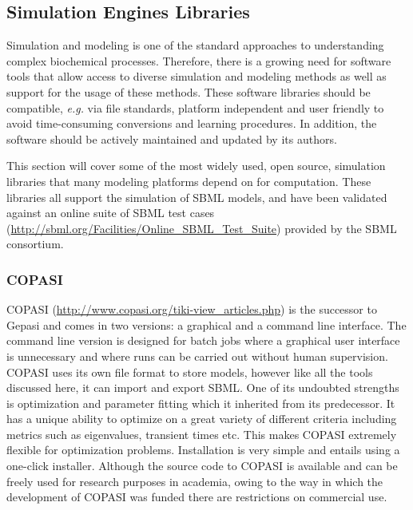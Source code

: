 \documentclass[]{article}
\begin{document}
\subsection{Simulation Engines Libraries}

Simulation and modeling is one of the standard approaches to
understanding complex biochemical processes. Therefore, there is a
growing need for software tools that allow access to diverse simulation
and modeling methods as well as support for the usage of these methods.
These software libraries should be compatible, \emph{e.g.} via file
standards, platform independent and user friendly to avoid
time-consuming conversions and learning procedures. In addition, the
software should be actively maintained and updated by its authors.

This section will cover some of the most widely used, open source,
simulation libraries that many modeling platforms depend on for
computation. These libraries all support the simulation of SBML models,
and have been validated against an online suite of SBML test cases
(\url{http://sbml.org/Facilities/Online_SBML_Test_Suite}) provided by
the SBML consortium.

\subsubsection{COPASI}

COPASI \autocite{hoops2006copasi}
(\url{http://www.copasi.org/tiki-view_articles.php}) is the successor to
Gepasi and comes in two versions: a graphical and a command line
interface. The command line version is designed for batch jobs where a
graphical user interface is unnecessary and where runs can be carried
out without human supervision. COPASI uses its own file format to store
models, however like all the tools discussed here, it can import and
export SBML. One of its undoubted strengths is optimization and
parameter fitting which it inherited from its predecessor. It has a
unique ability to optimize on a great variety of different criteria
including metrics such as eigenvalues, transient times etc. This makes
COPASI extremely flexible for optimization problems. Installation is
very simple and entails using a one-click installer. Although the source
code to COPASI is available and can be freely used for research purposes
in academia, owing to the way in which the development of COPASI was
funded there are restrictions on commercial use.
\end{document}
